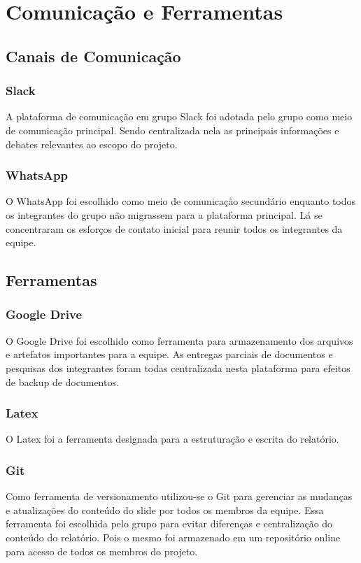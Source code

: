 \chapter[Comunicação e Ferramentas]{Comunicação e Ferramentas}

\section{Canais de Comunicação}

\subsection{Slack}
A plataforma de comunicação em grupo Slack foi adotada pelo grupo como meio de comunicação principal.
Sendo centralizada nela as principais informações e debates relevantes ao escopo do projeto.

\subsection{WhatsApp}
O WhatsApp foi escolhido como meio de comunicação secundário enquanto todos os integrantes do grupo
não migrassem para a plataforma principal. Lá se concentraram os esforços de contato inicial para reunir
todos os integrantes da equipe.

\section{Ferramentas}

\subsection{Google Drive}
O Google Drive foi escolhido como ferramenta para armazenamento dos arquivos e artefatos importantes para a
equipe. As entregas parciais de documentos e pesquisas dos integrantes foram todas centralizada nesta plataforma
para efeitos de backup de documentos.

\subsection{Latex}
O Latex foi a ferramenta designada para a estruturação e escrita do relatório.

\subsection{Git}
Como ferramenta de versionamento utilizou-se o Git para gerenciar as mudanças e atualizações do conteúdo do slide
por todos os membros da equipe. Essa ferramenta foi escolhida pelo grupo para evitar diferenças e centralização do
conteúdo do relatório. Pois o mesmo foi armazenado em um repositório online para acesso de todos os membros do projeto.
